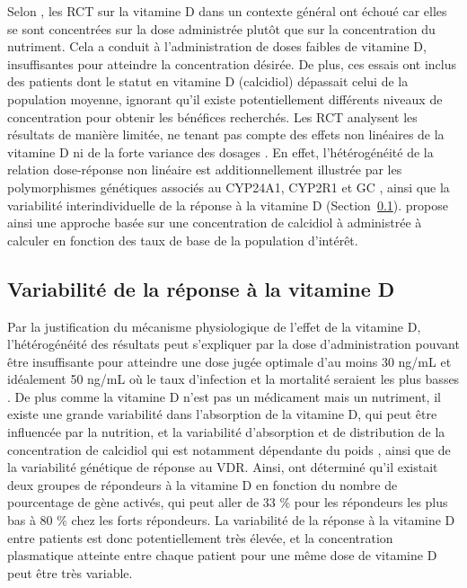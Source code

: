 \documentclass[
  a4paper,
  DIV=11,
  numbers=noendperiod,
  listof=totoc]{scrreprt}
\begin{document}
Selon \textcite{Grant.2022.nutrients}, les \ac{RCT} sur la vitamine D
dans un contexte général ont échoué car elles se sont concentrées sur la
dose administrée plutôt que sur la concentration du nutriment. Cela a
conduit à l'administration de doses faibles de vitamine D, insuffisantes
pour atteindre la concentration désirée. De plus, ces essais ont inclus
des patients dont le statut en vitamine D (calcidiol) dépassait celui de
la population moyenne, ignorant qu'il existe potentiellement différents
niveaux de concentration pour obtenir les bénéfices recherchés. Les
\ac{RCT} analysent les résultats de manière limitée, ne tenant pas
compte des effets non linéaires de la vitamine D ni de la forte variance
des dosages \autocite{Grant.2022,Grant.2018}. En effet, l'hétérogénéité
de la relation dose-réponse non linéaire est additionnellement illustrée
par les polymorphismes génétiques associés au CYP24A1, CYP2R1 et GC
\autocite{Grant.2018}, ainsi que la variabilité interindividuelle de la
réponse à la vitamine D \autocite{Vukić.2015}
(Section~\ref{sec-variabilite-reponse}). \textcite{Grant.2018} propose
ainsi une approche basée sur une concentration de calcidiol à
administrée à calculer en fonction des taux de base de la population
d'intérêt.

\subsection{Variabilité de la réponse à la vitamine
D}\label{sec-variabilite-reponse}

Par la justification du mécanisme physiologique de l'effet de la
vitamine D, l'hétérogénéité des résultats peut s'expliquer par la dose
d'administration pouvant être insuffisante pour atteindre une dose jugée
optimale d'au moins 30 ng/mL et idéalement 50 ng/mL où le taux
d'infection et la mortalité seraient les plus basses
\autocite{Wimalawansa.2022,Kaufman.2020,Borsche.2021}. De plus comme la
vitamine D n'est pas un médicament mais un nutriment, il existe une
grande variabilité dans l'absorption de la vitamine D, qui peut être
influencée par la nutrition, et la variabilité d'absorption et de
distribution de la concentration de calcidiol qui est notamment
dépendante du poids \autocite{Ekwaru.2014}, ainsi que de la variabilité
génétique de réponse au \ac{VDR}. Ainsi, \textcite{Vukić.2015} ont
déterminé qu'il existait deux groupes de répondeurs à la vitamine D en
fonction du nombre de pourcentage de gène activés, qui peut aller de 33
\% pour les répondeurs les plus bas à 80 \% chez les forts répondeurs.
La variabilité de la réponse à la vitamine D entre patients est donc
potentiellement très élevée, et la concentration plasmatique atteinte
entre chaque patient pour une même dose de vitamine D peut être très
variable.
\end{document}

